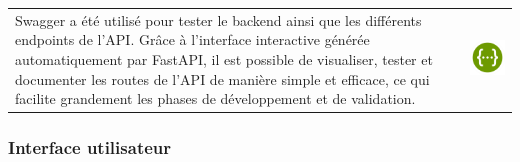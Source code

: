 \documentclass{article}
\begin{document}
\vspace{0,3cm}
\noindent
\begin{tabular}
{@{}m{}@{\hspace{1em}}m{}@{}}
 Swagger a été utilisé pour tester le backend ainsi que les différents endpoints de l’API. Grâce à l’interface interactive générée automatiquement par FastAPI, il est possible de visualiser, tester et documenter les routes de l’API de manière simple et efficace, ce qui facilite grandement les phases de développement et de validation.


&
\includegraphics[width=\linewidth]{Swagger-logo.png} %
\end{tabular}




\subsubsection{Interface utilisateur}
\end{document}
